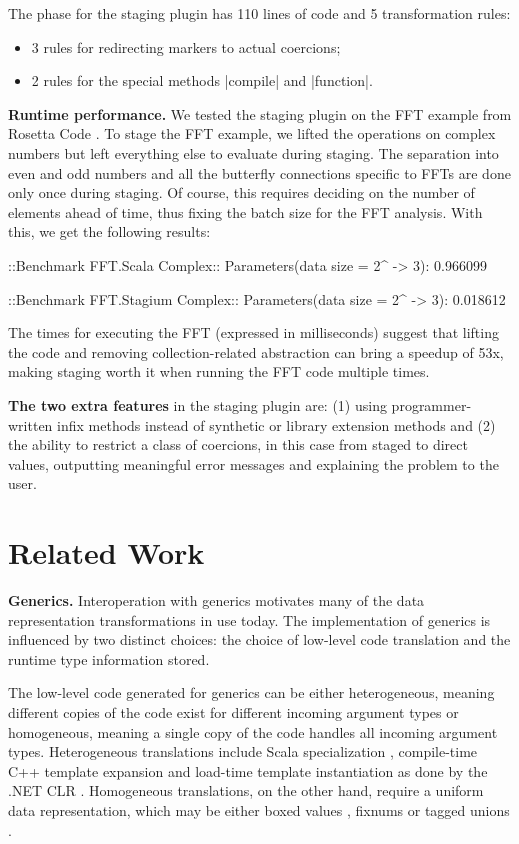 The \commit{} phase for the staging plugin has 110 lines of code and 5 transformation rules:
\begin{itemize}
\item  3 rules for redirecting markers to actual coercions;
\item  2 rules for the special methods |compile| and |function|.
\end{itemize}

\textbf{Runtime performance.} We tested the staging plugin on the FFT example from Rosetta Code \cite{rosetta-code}. To stage the FFT example, we lifted the operations on complex numbers but left everything else to evaluate during staging. The separation into even and odd numbers and all the butterfly connections specific to FFTs are done only once during staging. Of course, this requires deciding on the number of elements ahead of time, thus fixing the batch size for the FFT analysis. With this, we get the following results:

\begin{lstlisting-nobreak}
 ::Benchmark FFT.Scala Complex::
 Parameters(data size = 2^ -> 3): 0.966099

 ::Benchmark FFT.Stagium Complex::
 Parameters(data size = 2^ -> 3): 0.018612
\end{lstlisting-nobreak}

The times for executing the FFT (expressed in milliseconds) suggest that lifting the code and removing collection-related abstraction can bring a speedup of 53x, making staging worth it when running the FFT code multiple times.

\textbf{The two extra features} in the staging plugin are: (1) using programmer-written infix methods instead of synthetic or library extension methods and (2) the ability to restrict a class of coercions, in this case from staged to direct values, outputting meaningful error messages and explaining the problem to the user.

\section{Related Work}
\label{ldl:sec:related}

\textbf{Generics.} Interoperation with generics motivates many of the data representation transformations in use today. The implementation of generics is influenced by two distinct choices: the choice of low-level code translation and the runtime type information stored.

The low-level code generated for generics can be either heterogeneous, meaning different copies of the code exist for different incoming argument types or homogeneous, meaning a single copy of the code handles all incoming argument types. Heterogeneous translations include Scala specialization \cite{iuli-thesis}, compile-time C++ template expansion \cite{cxx-stroustrup} and load-time template instantiation \cite{dot-net-generics} as done by the .NET CLR \cite{ecma-dotnet}. Homogeneous translations, on the other hand, require a uniform data representation, which may be either boxed values \cite{java-erasure, leroy-unboxed-objects}, fixnums \cite{fixnums-lisp} or tagged unions \cite{morrison-napier88}.

